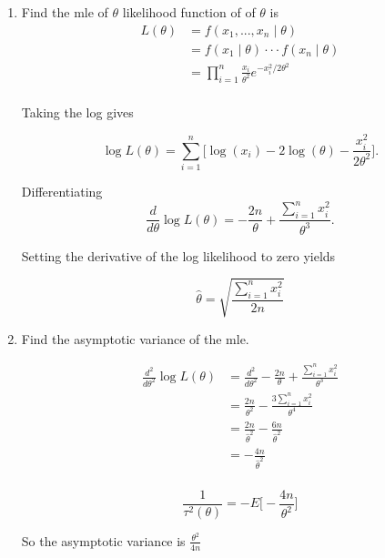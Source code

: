 \documentclass{tufte-book}
\theoremstyle{mytheoremstyle}
\theoremstyle{mylemstyle}
\theoremstyle{mydefstyle}
\begin{document}
\begin{enumerate}
\item Find the mle of $\theta$
 likelihood function of of $\theta$ is
\begin{align*}
L(\theta) &= f(x_1,...,x_n \mid \theta)\\
&= f(x_1 \mid \theta) \cdot \cdot \cdot f(x_n \mid \theta)\\
&= \prod_{i=1}^n \frac{x_i}{\theta^2}e^{-x_i^2/2\theta^2}\\
\end{align*}

Taking the log gives

\[ \log L(\theta) = \sum_{i=1}^n \Big[ \log(x_i) - 2\log(\theta) - \frac{x_i^2}{2\theta^2} \Big]. \]

Differentiating
\[ \frac{d}{d\theta} \log L(\theta) = -\frac{2n}{\theta} + \frac{\sum_{i=1}^n x_i^2}{\theta^3}. \]

Setting the derivative of the log likelihood to zero yields

\[\hat{\theta} = \sqrt{\frac{\sum_{i=1}^n x_i^2}{2n}} \]
\item Find the asymptotic variance of the mle.

\begin{align*}
\frac{d^2}{d\theta^2} \log L(\theta)  &= \frac{d^2}{d\theta^2} -\frac{2n}{\theta} + \frac{\sum_{i=1}^n x_i^2}{\theta^3}\\
&= \frac{2n}{\theta^2} - \frac{3 \sum_{i=1}^n x_i^2}{\theta^4} \\
&= \frac{2n}{\hat{\theta}^2} - \frac{6n}{\hat{\theta}^2}\\
&= -\frac{4n}{\hat{\theta}^2}\\
\end{align*}

\[ \frac{1}{\tau^2(\theta)} = -E \Big[ -\frac{4n}{\theta^2}\Big] \]

So the asymptotic variance is $\frac{\theta^2}{4n}$
\end{enumerate}
\end{document}
